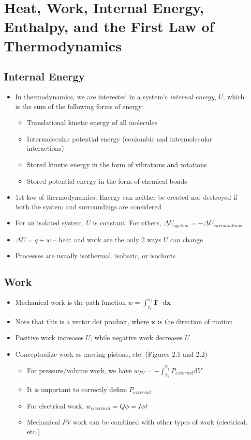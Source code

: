 \documentclass[12pt, openany, letterpaper]{memoir}
\begin{document}
\chapter{Heat, Work, Internal Energy, Enthalpy, and the First Law of Thermodynamics}
\section*{Internal Energy}
\begin{itemize}
	\item In thermodynamics, we are interested in a system's \emph{internal energy}, $U$, which is the sum of the following forms of energy:
	\begin{itemize}
		\item Translational kinetic energy of all molecules
		\item Intermolecular potential energy (coulombic and intermolecular interactions)
		\item Stored kinetic energy in the form of vibrations and rotations
		\item Stored potential energy in the form of chemical bonds
	\end{itemize}
	\item 1st law of thermodynamics: Energy can neither be created nor destroyed if both the system and surroundings are considered
	\item For an isolated system, $U$ is constant. For others, $\Delta U_{system} = -\Delta U_{surroundings}$
	\item $\Delta U = q + w$ -- heat and work are the only 2 ways $U$ can change
	\item Processes are usually isothermal, isobaric, or isochoric		
\end{itemize}
\section*{Work}
\begin{itemize}
	\item Mechanical work is the path function $w=\int_{x_i}^{x_f}\!\mathbf{F}\cdot\mathrm{d}\mathbf{x}$
	\item Note that this is a vector dot product, where $\mathbf{x}$ is the direction of motion
	\item Positive work increases $U$, while negative work decreases $U$
	\item Conceptualize work as moving pistons, etc. (Figures 2.1 and 2.2)
	\begin{itemize}
		\item For pressure/volume work, we have $w_{PV}=-\int_{V_i}^{V_f}\!P_{external}\mathrm{d}V$
		\item It is important to correctly define $P_{external}$
		\item For electrical work, $w_{electrical} = Q\phi=I\phi t$
		\item Mechanical $PV$ work can be combined with other types of work (electrical, etc.)		
	\end{itemize}	
\end{itemize}
\end{document}
